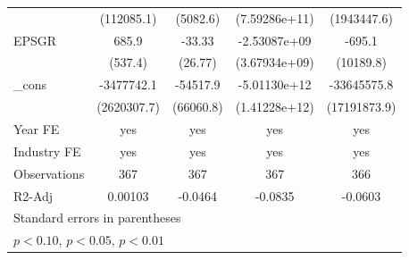 \begin{table}[htbp]
\begin{tabular}{l*{4}{c}}
                    &  (112085.1)         &    (5082.6)         &(7.59286e+11)         & (1943447.6)         \\
EPSGR               &       685.9         &      -33.33         &-2.53087e+09         &      -695.1         \\
                    &     (537.4)         &     (26.77)         &(3.67934e+09)         &   (10189.8)         \\
\_cons              &  -3477742.1         &    -54517.9         &-5.01130e+12\sym{***}& -33645575.8\sym{*}  \\
                    & (2620307.7)         &   (66060.8)         &(1.41228e+12)         &(17191873.9)         \\
\hline
Year FE             &         yes         &         yes         &         yes         &         yes         \\
Industry FE         &         yes         &         yes         &         yes         &         yes         \\
Observations        &         367         &         367         &         367         &         366         \\
R2-Adj              &     0.00103         &     -0.0464         &     -0.0835         &     -0.0603         \\
\hline\hline
\multicolumn{5}{l}{\footnotesize Standard errors in parentheses}\\
\multicolumn{5}{l}{\footnotesize \sym{*} \(p<0.10\), \sym{**} \(p<0.05\), \sym{***} \(p<0.01\)}\\
\end{tabular}
\end{table}
